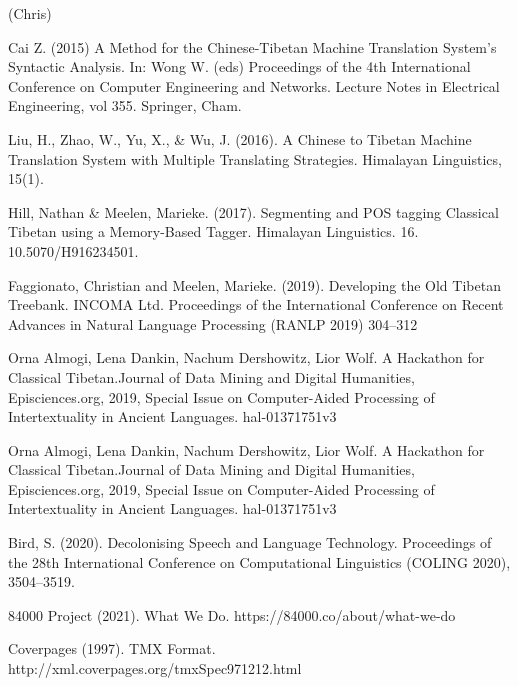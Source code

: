 \documentclass[letterpaper, 10 pt, conference]{ieeeconf}  %
\begin{document}
(Chris)
\begin{thebibliography}{99}



 Cai Z. (2015) A Method for the Chinese-Tibetan Machine Translation System’s Syntactic Analysis. In: Wong W. (eds) Proceedings of the 4th International Conference on Computer Engineering and Networks. Lecture Notes in Electrical Engineering, vol 355. Springer, Cham. 

 Liu, H., Zhao, W., Yu, X., & Wu, J. (2016). A Chinese to Tibetan Machine Translation System with Multiple Translating Strategies. Himalayan Linguistics, 15(1).

 Hill, Nathan & Meelen, Marieke. (2017). Segmenting and POS tagging Classical Tibetan using a Memory-Based Tagger. Himalayan Linguistics. 16. 10.5070/H916234501. 

 Faggionato, Christian  and Meelen, Marieke. (2019). Developing the Old Tibetan Treebank. INCOMA Ltd. Proceedings of the International Conference on Recent Advances in Natural Language Processing (RANLP 2019) 304--312


 Orna Almogi, Lena Dankin, Nachum Dershowitz, Lior Wolf. A Hackathon for Classical Tibetan.Journal of Data Mining and Digital Humanities, Episciences.org, 2019, Special Issue on Computer-Aided Processing of Intertextuality in Ancient Languages. hal-01371751v3

 Orna Almogi, Lena Dankin, Nachum Dershowitz, Lior Wolf. A Hackathon for Classical Tibetan.Journal of Data Mining and Digital Humanities, Episciences.org, 2019, Special Issue on Computer-Aided Processing of Intertextuality in Ancient Languages. hal-01371751v3


 Bird, S. (2020). Decolonising Speech and Language Technology. Proceedings of the 28th International Conference on Computational Linguistics (COLING 2020), 3504–3519.


 84000 Project (2021). What We Do. https://84000.co/about/what-we-do


 Coverpages (1997). TMX Format. http://xml.coverpages.org/tmxSpec971212.html




\end{thebibliography}
\end{document}
